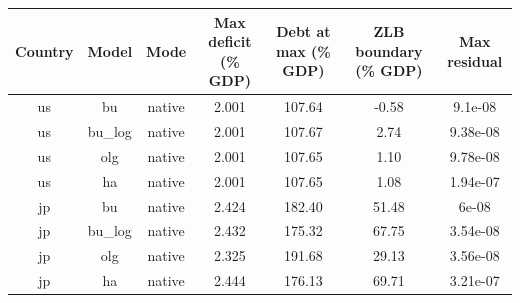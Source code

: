 \begin{table}[!ht]
\setlength\tabcolsep{0.425em}
\setlength\aboverulesep{0pt}
\setlength\belowrulesep{0.2em}
\centering
\begin{threeparttable}
\begin{tabular}{ccccccc}
\toprule[0.1em]
Country & Model & Mode & Max deficit (\% GDP) & Debt at max (\% GDP) & ZLB boundary (\% GDP) & Max residual \\[0.2em]
\midrule[0.075em]
us & bu & native & 2.001 & 107.64 & -0.58 & 9.1e-08 \\[0.2em]
us & bu\_log & native & 2.001 & 107.67 & 2.74 & 9.38e-08 \\[0.2em]
us & olg & native & 2.001 & 107.65 & 1.10 & 9.78e-08 \\[0.2em]
us & ha & native & 2.001 & 107.65 & 1.08 & 1.94e-07 \\[0.2em]
jp & bu & native & 2.424 & 182.40 & 51.48 & 6e-08 \\[0.2em]
jp & bu\_log & native & 2.432 & 175.32 & 67.75 & 3.54e-08 \\[0.2em]
jp & olg & native & 2.325 & 191.68 & 29.13 & 3.56e-08 \\[0.2em]
jp & ha & native & 2.444 & 176.13 & 69.71 & 3.21e-07 \\[0.2em]
\bottomrule[0.1em]
\end{tabular}
\end{threeparttable}
\end{table}
